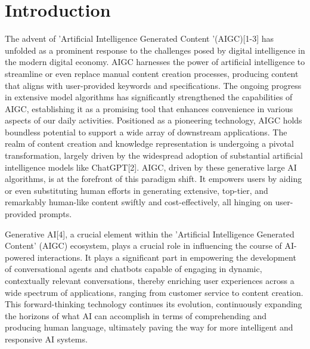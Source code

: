 \documentclass[conference]{IEEEtran}
\begin{document}
\section{Introduction}

The advent of 'Artificial Intelligence Generated Content '(AIGC)[1-3] has unfolded as a prominent response to the challenges posed by digital intelligence in the modern digital economy. AIGC harnesses the power of artificial intelligence to streamline or even replace manual content creation processes, producing content that aligns with user-provided keywords and specifications. The ongoing progress in extensive model algorithms has significantly strengthened the capabilities of AIGC, establishing it as a promising tool that enhances convenience in various aspects of our daily activities. Positioned as a pioneering technology, AIGC holds boundless potential to support a wide array of downstream applications. The realm of content creation and knowledge representation is undergoing a pivotal transformation, largely driven by the widespread adoption of substantial artificial intelligence models like ChatGPT[2]. AIGC, driven by these generative large AI algorithms, is at the forefront of this paradigm shift. It empowers users by aiding or even substituting human efforts in generating extensive, top-tier, and remarkably human-like content swiftly and cost-effectively, all hinging on user-provided prompts. 

\baselineskip

Generative AI[4], a crucial element within the 'Artificial Intelligence Generated Content' (AIGC) ecosystem, plays a crucial role in influencing the course of AI-powered interactions. It plays a significant part in empowering the development of conversational agents and chatbots capable of engaging in dynamic, contextually relevant conversations, thereby enriching user experiences across a wide spectrum of applications, ranging from customer service to content creation. This forward-thinking technology continues its evolution, continuously expanding the horizons of what AI can accomplish in terms of comprehending and producing human language, ultimately paving the way for more intelligent and responsive AI systems.
\end{document}
